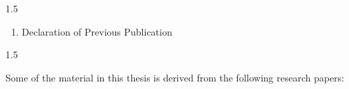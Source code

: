 \documentclass[fleqn, oneside, 12pt]{book}
\theoremstyle{definitionsty}
\newcommand{\uwinonehalfspacelen}{1.5}
\newcommand{\uwindefaultspacelen}{\uwinonehalfspacelen}
\newenvironment{uwindefaultspaceenv}%
{\begin{spacing}{\uwindefaultspacelen}}%
	{\end{spacing}}
\begin{document}
\begin{uwindefaultspaceenv}
\begin{enumerate}


		\item Declaration of Previous Publication
	\end{enumerate}
\end{uwindefaultspaceenv}

\begin{uwindefaultspaceenv}


	Some of the material in this thesis is derived from the following research
	papers:










\end{uwindefaultspaceenv}
\end{document}
